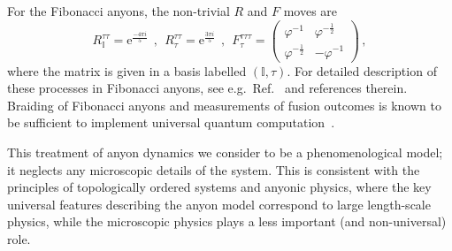 \documentclass[aps, prl, letterpaper, twocolumn, superscriptaddress, notitlepage, 10pt]{revtex4-1}
\newcommand{\e}{\mathrm{e}}
\newcommand{\vac}{\mathbb{I}}
\begin{document}
For the Fibonacci anyons, the non-trivial $R$ and $F$ moves are 
\begin{equation*}
	R_{\vac}^{\tau\tau} = \e^{\frac{-4\pi i}{5}} 
	\ \ , \ \
	R_\tau^{\tau\tau}= \e^{\frac{3\pi i}{5}} 
	\ \ , \ \
	F_{\tau}^{\tau\tau\tau} = \begin{pmatrix}\varphi^{-1}&\varphi^{-\frac{1}{2}}\\\varphi^{-\frac{1}{2}}&-\varphi^{-1}\end{pmatrix} \,,
\end{equation*}
where the matrix is given in a basis labelled $(\vac,\tau)$.
For detailed description of these 
processes in Fibonacci anyons, see e.g.~Ref.~\cite{Nayak2008} and references therein. 
Braiding of Fibonacci anyons and measurements of fusion outcomes is known to be 
sufficient to implement universal quantum computation~\cite{Freedman2002, Nayak2008}.

This treatment of anyon dynamics we consider to be a phenomenological model;
it neglects any microscopic details of the system.
This is consistent with the principles of topologically 
ordered systems and anyonic physics, where the key universal features describing the 
anyon model correspond to large length-scale physics, while the microscopic physics plays 
a less important (and non-universal) role.

\end{document}
